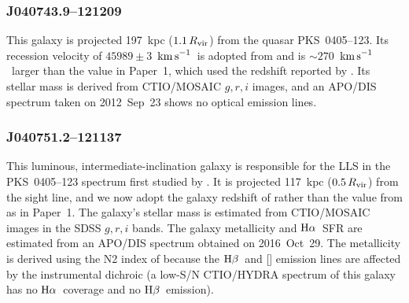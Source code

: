 \documentclass[twocolumn,twocolappendix,tighten,times]{aastex6}
\newcommand{\OIII}{\ion{O}{3}}
\newcommand{\Ha}{\ensuremath{{\rm H}\alpha}}
\newcommand{\Hb}{\ensuremath{{\rm H}\beta}}
\newcommand{\kms}{\ensuremath{{\rm km\,s}^{-1}}}
\begin{document}
\subsubsection{J040743.9--121209}
\label{indiv:galaxies:j0407-12a}

This galaxy is projected 197~kpc ($1.1\,R_{\rm vir}$) from the quasar 
PKS~0405--123. Its recession velocity of $45989\pm3$~\kms\ is adopted from 
\citet{johnson13} and is $\sim270$~\kms\ larger than the value in Paper~1, 
which used the redshift reported by \citet{chen01}. Its stellar mass is derived 
from CTIO/MOSAIC $g,r,i$ images, and an APO/DIS spectrum taken on 2012~Sep~23
shows no optical emission lines.



\subsubsection{J040751.2--121137}
\label{indiv:galaxies:j0407-12b}

This luminous, intermediate-inclination galaxy is responsible for the LLS in the 
PKS~0405--123 spectrum first studied by \citet{chen00}. It is projected 117~kpc 
($0.5\,R_{\rm vir}$) from the sight line, and we now adopt the galaxy redshift 
of \citet{johnson13} rather than the value from \citet{chen09} as in Paper~1.
The galaxy's stellar mass is estimated from CTIO/MOSAIC images in the SDSS 
$g,r,i$ bands. The galaxy metallicity and \Ha\ SFR are estimated from an APO/DIS 
spectrum obtained on 2016~Oct~29. The metallicity is derived using the N2 index of
\citet{pettini04} because the \Hb\ and [\OIII] emission lines are affected 
by the instrumental dichroic (a low-S/N CTIO/HYDRA spectrum of this galaxy has no 
\Ha\ coverage and no \Hb\ emission).

\end{document}

